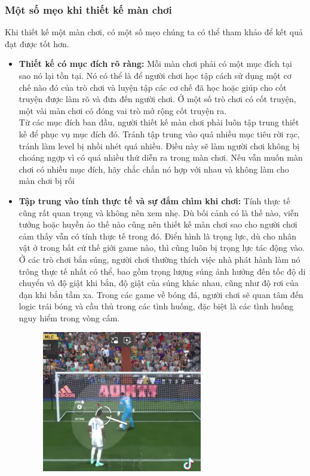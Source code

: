 \subsubsection{Một số mẹo khi thiết kế màn chơi}
\hspace*{0.5cm}  Khi thiết kế một màn chơi, có một số mẹo chúng ta có thể tham khảo để kết quả đạt được tốt hơn.
\begin{itemize}
	\item \textbf{Thiết kế có mục đích rõ ràng: } Mỗi màn chơi phải có một mục đích tại sao nó lại tồn tại. Nó có thể là để người chơi học tập cách sử dụng một cơ chế nào đó của trò chơi và luyện tập các cơ chế đã học hoặc giúp cho cốt truyện được làm rõ và đưa đến người chơi. Ở một số trò chơi có cốt truyện, một vài màn chơi có đóng vai trò mở rộng cốt truyện ra.\\
	Từ các mục đích ban đầu, người thiết kế màn chơi phải luôn tập trung thiết kế để phục vụ mục đích đó. Tránh tập trung vào quá nhiều mục tiêu rời rạc, tránh làm level bị nhồi nhét quá nhiều. Điều này sẽ làm người chơi không bị choáng ngợp vì có quá nhiều thứ diễn ra trong màn chơi. Nếu vẫn muốn màn chơi có nhiều mục đích, hãy chắc chắn nó hợp với nhau và không làm cho màn chơi bị rối
	\item \textbf{Tập trung vào tính thực tế và sự đắm chìm khi chơi: } Tính thực tế cũng rất quan trọng và không nên xem nhẹ. Dù bối cảnh có là thế nào, viễn tưởng hoặc huyền ảo thế nào cũng nên thiết kế màn chơi sao cho người chơi cảm thấy vẫn có tính thực tế trong đó. Điển hình là trọng lực, dù cho nhân vật ở trong bất cứ thế giới game nào, thì cũng luôn bị trọng lực tác động vào. Ở các trò chơi bắn súng, người chơi thường thích việc nhà phát hành làm nó trông thực tế nhất có thể, bao gồm trọng lượng súng ảnh hưởng đến tốc độ di chuyển và độ giật khi bắn, độ giật của súng khác nhau, cũng như độ rơi của đạn khi bắn tầm xa. Trong các game về bóng đá, người chơi sẽ quan tâm đến logic trái bóng và cầu thủ trong các tình huống, đặc biệt là các tình huống nguy hiểm trong vòng cấm.\\
	\begin{figure}[H]
		\centering
		\includegraphics[width=7cm]{Images/FIFAGlitch.png}

\end{figure}
\end{itemize}
